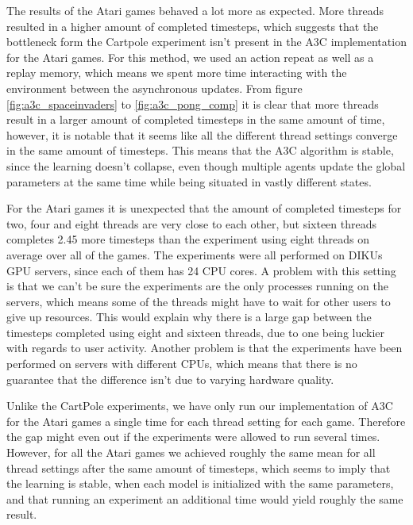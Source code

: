 \documentclass[11pt]{article}
\begin{document}
The results of the Atari games behaved a lot more as expected.
More threads resulted in a higher amount of completed timesteps,
which suggests that the bottleneck form the Cartpole experiment isn't present in
the A3C implementation for the Atari games.
For this method, we used an action repeat as well as a replay memory,
which means we spent more time interacting with the environment
between the asynchronous updates.
From figure \ref{fig:a3c_spaceinvaders} to \ref{fig:a3c_pong_comp}
it is clear that more threads result in a larger amount of completed timesteps
in the same amount of time,
however, it is notable that it seems like all the different thread
settings converge in the same amount of timesteps.
This means that the A3C algorithm is stable, since the learning
doesn't collapse, even though multiple agents update the global parameters at the same time 
while being situated in vastly different states.


For the Atari games it is unexpected that the amount of completed timesteps
for two, four and eight threads are very close to each other, but
sixteen threads completes 2.45 more timesteps than the experiment using eight
threads on average over all of the games.
The experiments were all performed on DIKUs GPU servers, since each of them
has 24 CPU cores.
A problem with this setting is that we can't be sure 
the experiments are the only processes running on the servers, which means
some of the threads might have to wait for other users to
give up resources.
This would explain why there is a large gap between the timesteps
completed using eight and sixteen threads, due to one
being luckier with regards to user activity.
Another problem is that the experiments have been performed on servers with different CPUs,
which means that there is no guarantee that the difference isn't due to
varying hardware quality.

Unlike the CartPole experiments, we have only run our implementation
of A3C for the Atari games a single time for each thread setting for each game.
Therefore the gap might even out if the experiments were allowed to run
several times.
However, for all the Atari games we achieved roughly the same mean
for all thread settings after the same amount of timesteps,
which seems to imply that the learning is stable, when each model is initialized
with the same parameters, and that running an experiment an additional time would yield
roughly the same result.
\end{document}
